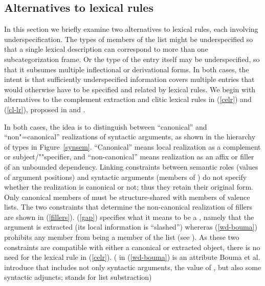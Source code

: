 \documentclass[output=paper
	        ,collection
	        ,collectionchapter
 	        ,biblatex
                ,babelshorthands
                ,newtxmath
                ,draftmode
                ,colorlinks, citecolor=brown
]{langscibook}
\begin{document}
\subsection{Alternatives to lexical rules}
\label{sec:alt}

In this section we briefly examine two alternatives to lexical rules, each involving underspecification. The types of members of the  list might be underspecified so that a single lexical description can correspond to more than one subcategorization frame. Or the type of the entry itself may be underspecified, so that it subsumes multiple inflectional or derivational forms. In both cases, the intent is that sufficiently underspecified information covers multiple entries that would otherwise have to be specified and related by lexical rules. We begin with alternatives to the complement extraction and clitic lexical rules in (\ref{celr}) and (\ref{cl-lr}), proposed in  and .%

In both cases, the idea is to distinguish between ``canonical'' and ``non"=canonical''  realizations of syntactic arguments, as shown in the hierarchy of  types in Figure~\ref{synsem}. ``Canonical'' means local realization as a complement or subject/""specifier, and ``non-canonical'' means realization as an affix or filler of an unbounded dependency. Linking constraints between semantic roles (values of argument positions)   and syntactic arguments (members of ) do not specify whether the realization is canonical or not; thus they retain their original form. Only canonical members of  must be structure-shared with members of valence lists. The two constraints that determine the non-canonical realization of fillers are shown in (\ref{fillers}). (\ref{gap}) specifies what it means to be a , namely that the argument is extracted (its local information is ``slashed'') whereras (\ref{wd-bouma}) prohibits any  member from being a member of the  list (see \citealt[23]{Boumaetal2001}). As these two constraints are compatible with either a canonical or extracted object, there is no need for the lexical rule in (\ref{celr}). ( in (\ref{wd-bouma}) is an attribute Bouma et al. introduce that includes not only syntactic arguments, the value of , but also some syntactic adjuncts; \- stands for list substraction)
\end{document}
